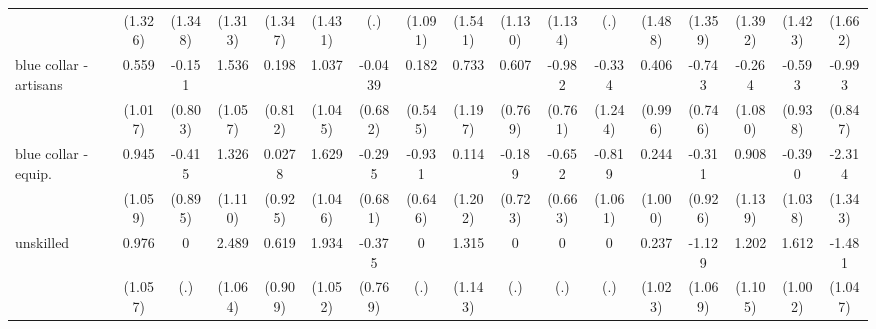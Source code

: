 {\begin{tabular}{l*{16}{c}}
                    &     (1.326)         &     (1.348)         &     (1.313)         &     (1.347)         &     (1.431)         &         (.)         &     (1.091)         &     (1.541)         &     (1.130)         &     (1.134)         &         (.)         &     (1.488)         &     (1.359)         &     (1.392)         &     (1.423)         &     (1.662)         \\
[1em]
blue collar - artisans&       0.559         &      -0.151         &       1.536         &       0.198         &       1.037         &     -0.0439         &       0.182         &       0.733         &       0.607         &      -0.982         &      -0.334         &       0.406         &      -0.743         &      -0.264         &      -0.593         &      -0.993         \\
                    &     (1.017)         &     (0.803)         &     (1.057)         &     (0.812)         &     (1.045)         &     (0.682)         &     (0.545)         &     (1.197)         &     (0.769)         &     (0.761)         &     (1.244)         &     (0.996)         &     (0.746)         &     (1.080)         &     (0.938)         &     (0.847)         \\
[1em]
blue collar - equip.&       0.945         &      -0.415         &       1.326         &      0.0278         &       1.629         &      -0.295         &      -0.931         &       0.114         &      -0.189         &      -0.652         &      -0.819         &       0.244         &      -0.311         &       0.908         &      -0.390         &      -2.314         \\
                    &     (1.059)         &     (0.895)         &     (1.110)         &     (0.925)         &     (1.046)         &     (0.681)         &     (0.646)         &     (1.202)         &     (0.723)         &     (0.663)         &     (1.061)         &     (1.000)         &     (0.926)         &     (1.139)         &     (1.038)         &     (1.343)         \\
[1em]
unskilled           &       0.976         &           0         &       2.489\sym{*}  &       0.619         &       1.934         &      -0.375         &           0         &       1.315         &           0         &           0         &           0         &       0.237         &      -1.129         &       1.202         &       1.612         &      -1.481         \\
                    &     (1.057)         &         (.)         &     (1.064)         &     (0.909)         &     (1.052)         &     (0.769)         &         (.)         &     (1.143)         &         (.)         &         (.)         &         (.)         &     (1.023)         &     (1.069)         &     (1.105)         &     (1.002)         &     (1.047)         \\

\end{tabular}}
